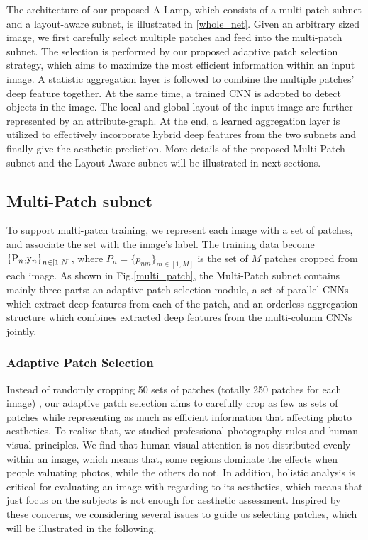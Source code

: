 \documentclass[10pt,twocolumn,letterpaper]{article}
\begin{document}
The architecture of our proposed A-Lamp, which consists of a multi-patch subnet and a layout-aware subnet, is illustrated in \ref{whole_net}. Given an arbitrary sized image, we first carefully select multiple patches and feed into the multi-patch subnet. The selection is performed by our proposed adaptive patch selection strategy, which aims to maximize the most efficient information within an input image. A statistic aggregation layer is followed to combine the multiple patches' deep feature together.
At the same time, a trained CNN is adopted to detect objects in the image. The local and global layout of the input image are further represented by an attribute-graph. At the end, a learned aggregation layer is utilized to effectively incorporate hybrid deep features from the two subnets and finally give the aesthetic prediction. 
More details of the proposed Multi-Patch subnet and the Layout-Aware subnet will be illustrated in next sections. 

\subsection{Multi-Patch subnet}
To support multi-patch training, we represent each image with a set of patches, 
and associate the set with the image's label.
The training data become ${{\rm{\{ }}{{\rm{P}}_n}{\rm{, }}{{\rm{y}}_n}{\rm{\} }}_{n \in [1,N]}}$, where ${P_n} = {\{ {p_{nm}}\} _{m \in [1,M]}}$ is the set of $M$ patches cropped from each image. 
As shown in Fig.\ref{multi_patch}, the Multi-Patch subnet contains mainly three parts: an adaptive patch selection module, a set of parallel CNNs which extract deep features from each of the patch, and an orderless aggregation structure which combines extracted deep features from the multi-column CNNs jointly.

\subsubsection{Adaptive Patch Selection}
Instead of randomly cropping 50 sets of patches (totally 250 patches for each image) \cite{Lu:2015:ICCV}, our adaptive patch selection aims to carefully crop as few as sets of patches while representing as much as efficient information 
that affecting photo aesthetics. To realize that, we studied professional 
photography rules and human visual principles. 
We find that human visual attention is not distributed evenly within an image, 
which means that, some regions dominate the effects when people valuating
photos, while the others do not. In addition, holistic analysis is critical 
for evaluating an image with regarding to its aesthetics, which means that 
just focus on the subjects is not enough for aesthetic assessment.
Inspired by these concerns, we considering several issues to 
guide us selecting patches, which will be illustrated in the following.
\end{document}
